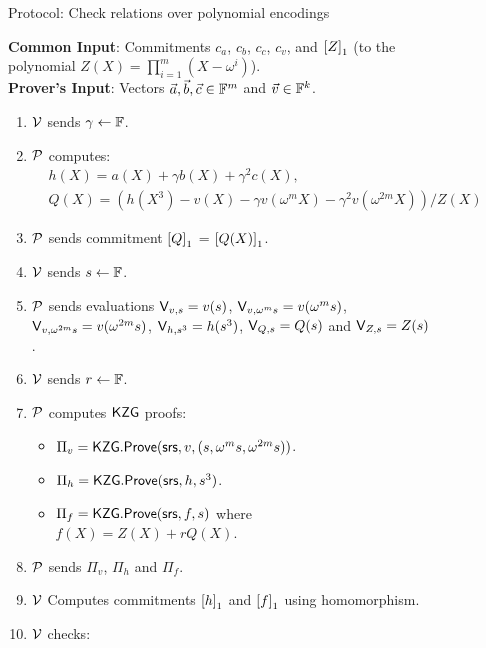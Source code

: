 \begin{figure}[htbp]
    \caption{Protocol: Check relations over polynomial encodings}
    \label{fig:encoded-relations}
\end{figure}

\begin{figure}[htbp]
    \begin{mdframed}
    {
            {\bf Common Input}: Commitments $c_a$, $c_b$, $c_c$, $c_v$, and $\gone{Z}$ (to the polynomial
        $Z(X)=\prod_{i=1}^m (X-\omega^i)$). \\
    {\bf Prover's Input}: Vectors $\vec{a},\vec{b},\vec{c}\in\F^m$ and $\vec{v}\in \F^k$.
        \begin{enumerate}[leftmargin=1em, label=\arabic*.]
            \item $\verifier$ sends $\gamma\gets \F$.
            \item $\prover$ computes:
            \begin{align}
                & h(X) = a(X) + \gamma b(X) + \gamma^2 c(X),\\
                & Q(X) = (h(X^3) - v(X) - \gamma v(\omega^m X) - \gamma^2 v(\omega^{2m} X))/Z(X)
            \end{align}
            \item $\prover$ sends commitment $\gone{Q}$ = $\gone{Q(X)}$.
            \item $\verifier$ sends $s\gets\F$.
            \item $\prover$ sends evaluations $\val{s}{v}=v(s)$, $\val{\omega^m s}{v}=v(\omega^m s)$,
            $\val{\omega^{2m}s}{v}=v(\omega^{2m} s)$, $\val{s^3}{h}=h(s^3)$, $\val{s}{Q}=Q(s)$ and $\val{s}{Z}=Z(s)$.
            \item $\verifier$ sends $r\gets\F$.
            \item $\prover$ computes $\kzg$ proofs:
            \begin{itemize}[leftmargin=1em]
                \item $\Pi_v=\kzgprove(\srs,v,(s,\omega^m s, \omega^{2m}s))$.
                \item $\Pi_h=\kzgprove(\srs,h,s^3)$.
                \item $\Pi_f=\kzgprove(\srs,f,s)$ where $f(X)=Z(X) + rQ(X)$.
            \end{itemize}
            \item $\prover$ sends $\Pi_v$, $\Pi_h$ and $\Pi_f$.
            \item $\verifier$ Computes commitments $\gone{h}$ and $\gone{f}$ using homomorphism.
            \item $\verifier$ checks:

\end{enumerate}}
\end{mdframed}
\end{figure}
